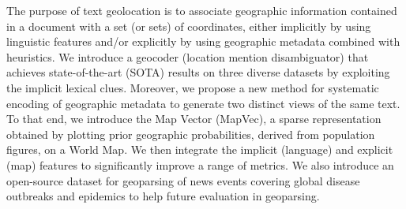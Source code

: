 The purpose of text geolocation is to associate geographic information contained in a document with a set (or sets) of coordinates, either implicitly by using linguistic features and/or explicitly by using geographic metadata combined with heuristics. We introduce a geocoder (location mention disambiguator) that achieves state-of-the-art (SOTA) results on three diverse datasets by exploiting the implicit lexical clues. Moreover, we propose a new method for systematic encoding of geographic metadata to generate two distinct views of the same text. To that end, we introduce the Map Vector (MapVec), a sparse representation obtained by plotting prior geographic probabilities, derived from population figures, on a World Map. We then integrate the implicit (language) and explicit (map) features to significantly improve a range of metrics. We also introduce an open-source dataset for geoparsing of news events covering global disease outbreaks and epidemics to help future evaluation in geoparsing.
